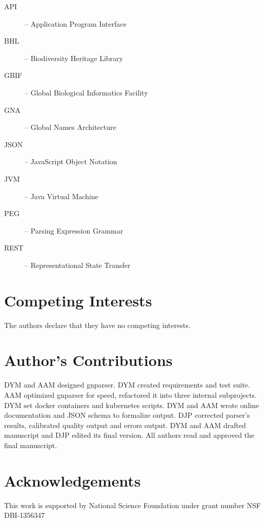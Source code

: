 \documentclass{bmcart}
\begin{document}
\begin{description}
  \item[API] -- Application Program Interface
  \item[BHL] -- Biodiversity Heritage Library
  \item[GBIF] -- Global Biological Informatics Facility
  \item[GNA] -- Global Names Architecture
  \item[JSON] -- JavaScript Object Notation
  \item[JVM] -- Java Virtual Machine
  \item[PEG] -- Parsing Expression Grammar
  \item[REST] -- Representational State Transfer
\end{description}

\section*{Competing Interests}

The authors declare that they have no competing interests.

\section*{Author's Contributions}

DYM and AAM designed gnparser. DYM created requirements and test suite. AAM
optimized gnparser for speed, refactored it into three internal subprojects.
DYM set docker containers and kubernetes scripts. DYM and AAM wrote online
documentation and JSON schema to formalize output. DJP corrected parser's
results, calibrated quality output and errors output. DYM and AAM drafted
manuscript and DJP edited its final version. All authors read and approved the
final manuscript.

\section*{Acknowledgements}

This work is supported by National Science Foundation under grant number NSF
DBI-1356347



\end{document}
